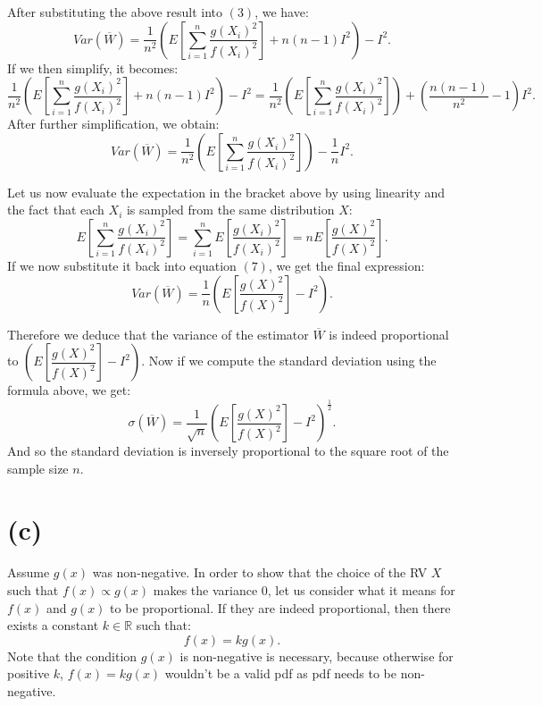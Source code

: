 \documentclass[12pt]{article}
\newcommand\R{\mathbb{R}}
\begin{document}
After substituting the above result into $ (3) $, we have:
\begin{equation}
  Var (\overline{W}) = \frac{1}{n^2} \left(E \left[\sum_{i = 1}^n \frac{g(X_i)^2}{f(X_i)^2} \right] + n (n - 1) I^2 
 \right) - I^2.
\end{equation}
If we then simplify, it becomes:
\[
  \frac{1}{n^2} \left(E \left[\sum_{i = 1}^n \frac{g(X_i)^2}{f(X_i)^2} \right] + n (n - 1) I^2 \right) - I^2
  =\frac{1}{n^2} \left(E \left[\sum_{i = 1}^n \frac{g(X_i)^2}{f(X_i)^2} \right]\right) + \left( \frac{n(n-1)}{n^2} - 1 \right)I^2.
\]
After further simplification, we obtain:
\begin{equation}
  Var (\overline{W}) 
  =\frac{1}{n^2} \left(E \left[\sum_{i = 1}^n \frac{g(X_i)^2}{f(X_i)^2} \right]\right) - \frac{1}{n}I^2.
\end{equation}

Let us now evaluate the expectation in the bracket above by using linearity and the fact that each $X_i$
is sampled from the same distribution $X$:
\[
  E \left[\sum_{i = 1}^n \frac{g(X_i)^2}{f(X_i)^2}\right]
  = \sum_{i = 1}^n E \left[ \frac{g(X_i)^2}{f(X_i)^2} \right]
  = n E\left[ \frac{g(X)^2}{f(X)^2} \right].
\]
If we now substitute it back into equation $ (7) $, we get the final expression:
\begin{equation}
  Var (\overline{W}) 
=\frac{1}{n} \left(E \left[\frac{g(X)^2}{f(X)^2} \right] - I^2 \right).
\end{equation}

Therefore we deduce that the variance of the estimator $ \overline{W} $ is indeed proportional to 
$ \left(E \left[\dfrac{g(X)^2}{f(X)^2} \right] - I^2 \right) $.
Now if we compute the standard deviation using the formula above, we get:
\begin{equation}
  \sigma (\overline{W}) 
  =\frac{1}{\sqrt{n}} \left(E \left[ \frac{g(X)^2}{f(X)^2} \right] - I^2 \right)^\frac{1}{2}.
\end{equation}
And so the standard deviation is inversely proportional to the square root of the sample size $ n $.

\section*{(c)}

Assume $ g(x) $ was non-negative. In order to show that the choice of the RV $ X $ such that $ f(x) \propto g(x) $ 
makes the variance $ 0 $, let us consider what it means for $ f(x) $ and $ g(x) $ to be proportional.
If they are indeed proportional, then there exists a constant $ k \in \R $ such that:
\[ f(x) = k g(x). \]
Note that the condition $ g(x) $ is non-negative is necessary, because otherwise for positive $ k $, $ f(x) = kg(x) $
wouldn't be a valid pdf as pdf needs to be non-negative.
\end{document}
